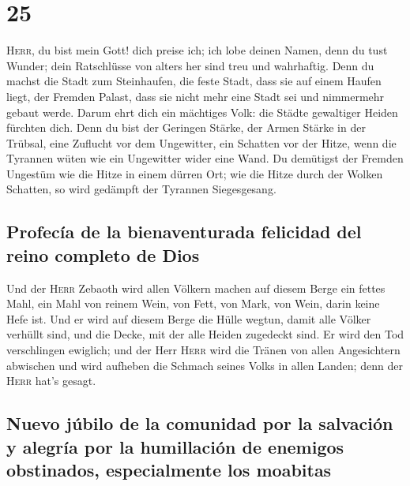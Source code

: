 \hypertarget{section-24}{%
\section{25}\label{section-24}}

 \textsc{Herr}, du bist mein Gott! dich preise ich; ich
lobe deinen Namen, denn du tust Wunder; dein Ratschlüsse von alters her
sind treu und wahrhaftig.  Denn du machst die Stadt zum
Steinhaufen, die feste Stadt, dass sie auf einem Haufen liegt, der
Fremden Palast, dass sie nicht mehr eine Stadt sei und nimmermehr gebaut
werde.  Darum ehrt dich ein mächtiges Volk: die Städte
gewaltiger Heiden fürchten dich.  Denn du bist der
Geringen Stärke, der Armen Stärke in der Trübsal, eine Zuflucht vor dem
Ungewitter, ein Schatten vor der Hitze, wenn die Tyrannen wüten wie ein
Ungewitter wider eine Wand.  Du demütigst der Fremden
Ungestüm wie die Hitze in einem dürren Ort; wie die Hitze durch der
Wolken Schatten, so wird gedämpft der Tyrannen Siegesgesang.

\hypertarget{profecuxeda-de-la-bienaventurada-felicidad-del-reino-completo-de-dios}{%
\subsection{Profecía de la bienaventurada felicidad del reino completo
de
Dios}\label{profecuxeda-de-la-bienaventurada-felicidad-del-reino-completo-de-dios}}

 Und der \textsc{Herr} Zebaoth wird allen Völkern machen
auf diesem Berge ein fettes Mahl, ein Mahl von reinem Wein, von Fett,
von Mark, von Wein, darin keine Hefe ist.  Und er wird auf
diesem Berge die Hülle wegtun, damit alle Völker verhüllt sind, und die
Decke, mit der alle Heiden zugedeckt sind.  Er wird den
Tod verschlingen ewiglich; und der Herr \textsc{Herr} wird die Tränen
von allen Angesichtern abwischen und wird aufheben die Schmach seines
Volks in allen Landen; denn der \textsc{Herr} hat's gesagt.

\hypertarget{nuevo-juxfabilo-de-la-comunidad-por-la-salvaciuxf3n-y-alegruxeda-por-la-humillaciuxf3n-de-enemigos-obstinados-especialmente-los-moabitas}{%
\subsection{Nuevo júbilo de la comunidad por la salvación y alegría por
la humillación de enemigos obstinados, especialmente los
moabitas}\label{nuevo-juxfabilo-de-la-comunidad-por-la-salvaciuxf3n-y-alegruxeda-por-la-humillaciuxf3n-de-enemigos-obstinados-especialmente-los-moabitas}}

